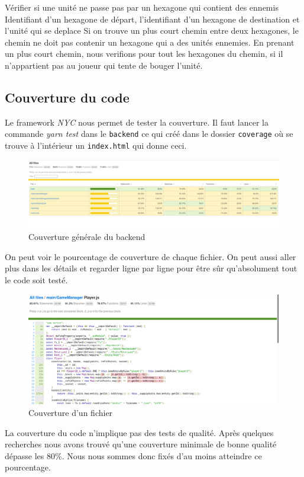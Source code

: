 \mytest
{Vérifier si une unité ne passe pas par un hexagone qui contient des ennemis}
{Identifiant d'un hexagone de départ, l'identifiant d'un hexagone de destination et l'unité qui se deplace}
{Si on trouve un plus court chemin entre deux hexagones, le chemin ne doit pas contenir un hexagone qui a des
    unités ennemies.}
{En prenant un plus court chemin, nous verifions pour tout les hexagones du chemin, si il n'appartient pas
    au joueur qui tente de bouger l'unité.}

\subsection{Couverture du code}

Le framework \emph{NYC} nous permet de tester la couverture. Il faut lancer la commande \emph{yarn test} dans le \lstinline{backend} ce qui créé dans le dossier \lstinline{coverage} où se trouve à l'intérieur un \lstinline{index.html} qui donne ceci.

\begin{figure}[H]
    \centering
    \includegraphics[scale=0.35]{data/couverture_test_1.jpg}
    \caption{Couverture générale du backend}
\end{figure}

On peut voir le pourcentage de couverture de chaque fichier. On peut aussi aller plus dans les détails et regarder ligne par ligne pour être sûr qu'absolument tout le code soit testé.

\begin{figure}[H]
    \centering
    \includegraphics[scale=0.3]{data/couverture_test_2.png}
    \caption{Couverture d'un fichier}
\end{figure}

La couverture du code n'implique pas des tests de qualité. Après quelques recherches nous avons trouvé qu'une couverture minimale de bonne qualité dépasse les 80\%. Nous nous sommes donc fixés d'au moins atteindre ce pourcentage.